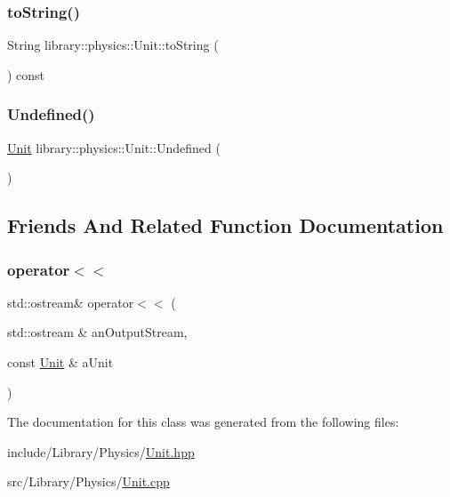 \mbox{\label{classlibrary_1_1physics_1_1_unit_a8c7c1e6ec7a16eeb446e956dd19a3fb8}} 
\subsubsection{\texorpdfstring{to\+String()}{toString()}}
{\footnotesize\ttfamily String library\+::physics\+::\+Unit\+::to\+String (\begin{DoxyParamCaption}{ }\end{DoxyParamCaption}) const}

\mbox{\label{classlibrary_1_1physics_1_1_unit_a9fb6d8c10aefa9a13cff18cf6d6e5733}} 
\subsubsection{\texorpdfstring{Undefined()}{Undefined()}}
{\footnotesize\ttfamily \hyperlink{classlibrary_1_1physics_1_1_unit}{Unit} library\+::physics\+::\+Unit\+::\+Undefined (\begin{DoxyParamCaption}{ }\end{DoxyParamCaption})\hspace{0.3cm}{\ttfamily [static]}}



\subsection{Friends And Related Function Documentation}
\mbox{\label{classlibrary_1_1physics_1_1_unit_a70630a82d569152709a999efabdb3e4f}} 
\subsubsection{\texorpdfstring{operator$<$$<$}{operator<<}}
{\footnotesize\ttfamily std\+::ostream\& operator$<$$<$ (\begin{DoxyParamCaption}\item[{std\+::ostream \&}]{an\+Output\+Stream,  }\item[{const \hyperlink{classlibrary_1_1physics_1_1_unit}{Unit} \&}]{a\+Unit }\end{DoxyParamCaption})\hspace{0.3cm}{\ttfamily [friend]}}



The documentation for this class was generated from the following files\+:\begin{DoxyCompactItemize}
\item 
include/\+Library/\+Physics/\hyperlink{_unit_8hpp}{Unit.\+hpp}\item 
src/\+Library/\+Physics/\hyperlink{_unit_8cpp}{Unit.\+cpp}\end{DoxyCompactItemize}
